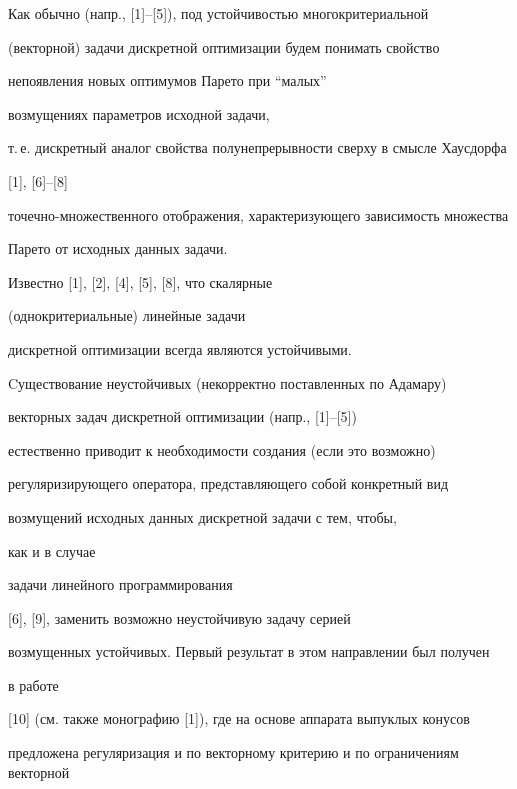 \maketitle


\label{begin}





Как обычно (напр., [1]--[5]), под устойчивостью многокритериальной


(векторной) задачи дискретной оптимизации будем понимать свойство


непоявления новых оптимумов Парето при ``малых''


возмущениях параметров исходной задачи,


т.\,е. дискретный аналог свойства полунепрерывности сверху в смысле Хаусдорфа


[1], [6]--[8]


точечно-множественного отображения, характеризующего зависимость множества


Парето от исходных данных задачи.





Известно [1], [2], [4], [5], [8], что скалярные


(однокритериальные) линейные задачи


дискретной оптимизации всегда являются устойчивыми.


Cуществование неустойчивых (некорректно поставленных по Адамару)


векторных задач дискретной оптимизации (напр., [1]--[5])


естественно приводит к необходимости создания (если это возможно)


регуляризирующего оператора, представляющего собой конкретный вид


возмущений исходных данных дискретной задачи с тем, чтобы,


как и в случае


задачи линейного программирования


[6], [9], заменить возможно неустойчивую задачу серией


возмущенных устойчивых. Первый результат в этом направлении был получен


в работе


[10] (см. также монографию [1]), где на основе аппарата выпуклых конусов


предложена регуляризация и по векторному критерию и по ограничениям векторной



